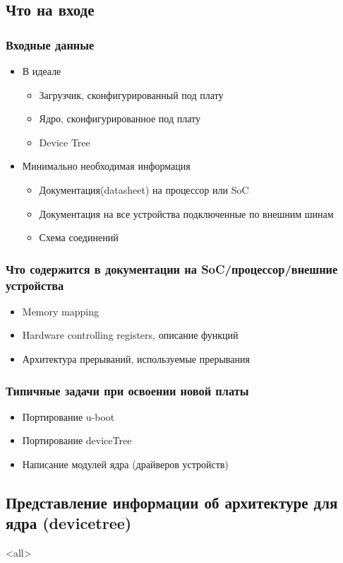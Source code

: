\subsection{Что на входе}
\begin{frame}
  \frametitle{Входные данные}
  \begin{itemize}
      \item В идеале
        \begin{itemize}
            \item Загрузчик, сконфигурированный под плату
            \item Ядро, сконфигурированное под  плату
            \item Device Tree 
        \end{itemize}
      \item Минимально необходимая информация
        \begin{itemize}
          \item Документация(datasheet) на процессор или SoC
          \item Документация на все устройства подключенные по внешним шинам
          \item Схема соединений
        \end{itemize}
  \end{itemize}
\end{frame}
\begin{frame}
  \frametitle{Что содержится в документации на SoC/процессор/внешние устройства}
  \begin{itemize}
      \item Memory mapping
      \item Hardware controlling registers, описание функций
      \item Архитектура прерываний, используемые прерывания
  \end{itemize}
\end{frame}
\begin{frame}
  \frametitle{Типичные задачи при освоении новой платы}
  \begin{itemize}
      \item Портирование u-boot
      \item Портирование deviceTree
      \item Написание модулей ядра (драйверов устройств)
  \end{itemize}
\end{frame}
\subsection{Представление информации об архитектуре для ядра (devicetree)}
\mode<all>{}

